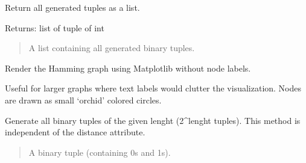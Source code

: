 \documentclass[letterpaper,10pt,english]{sphinxmanual}
\begin{document}
\begin{fulllineitems}

\begin{fulllineitems}
\label{\detokenize{index:hammindist.functions.HammingTupla.as_list}}
\pysigstartsignatures
\pysiglinewithargsret
{}
{}
{}
\pysigstopsignatures
\sphinxAtStartPar
Return all generated tuples as a list.

\sphinxAtStartPar
Returns:
list of tuple of int
\begin{quote}

\sphinxAtStartPar
A list containing all generated binary tuples.
\end{quote}

\end{fulllineitems}


\begin{fulllineitems}
\label{\detokenize{index:hammindist.functions.HammingTupla.draw}}
\pysigstartsignatures
\pysiglinewithargsret
{}
{}
{}
\pysigstopsignatures
\sphinxAtStartPar
Render the Hamming graph using Matplotlib without node labels.

\sphinxAtStartPar
Useful for larger graphs where text labels would clutter the
visualization. Nodes are drawn as small ‘orchid’ colored circles.

\end{fulllineitems}


\begin{fulllineitems}
\label{\detokenize{index:hammindist.functions.HammingTupla.get_instances_complete}}
\pysigstartsignatures
\pysiglinewithargsret
{}
{}
{}
\pysigstopsignatures
\sphinxAtStartPar
Generate all binary tuples of the given lenght (2\textasciicircum{}lenght tuples).
This method is independent of the distance attribute.
\begin{quote}\begin{description}
\sphinxAtStartPar
{} \textendash{} A binary tuple (containing 0s and 1s).


\end{description}
\end{quote}
\end{fulllineitems}
\end{fulllineitems}
\end{document}
